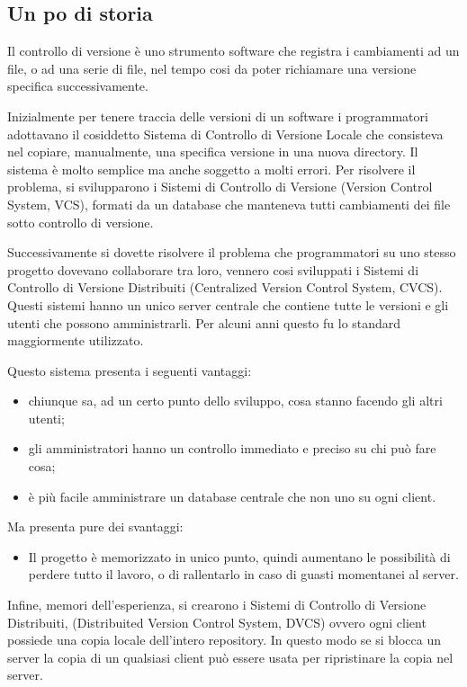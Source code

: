 \subsection{Un po di storia}
Il controllo di versione è uno strumento software che registra i cambiamenti ad un file, o ad una serie di file, nel tempo cosi da poter richiamare una versione specifica successivamente.

Inizialmente per tenere traccia delle versioni di un software i programmatori adottavano il cosiddetto Sistema di Controllo di Versione Locale che consisteva nel copiare, manualmente, una specifica versione in una nuova directory. Il sistema è molto semplice ma anche soggetto a molti errori. Per risolvere il problema, si svilupparono i Sistemi di Controllo di Versione (Version Control System, VCS), formati da un database che manteneva tutti cambiamenti dei file sotto controllo di versione.

Successivamente si dovette risolvere il problema che programmatori su uno stesso progetto dovevano collaborare tra loro, vennero cosi sviluppati i Sistemi di Controllo di Versione Distribuiti (Centralized Version Control System, CVCS). Questi sistemi hanno un unico server centrale che contiene tutte le versioni e gli utenti che possono amministrarli. Per alcuni anni questo fu lo standard maggiormente utilizzato.

Questo sistema presenta i seguenti vantaggi:

\begin{itemize}
\item chiunque sa, ad un certo punto dello sviluppo, cosa stanno facendo gli altri utenti;
\item gli amministratori hanno un controllo immediato e preciso su chi può fare cosa;
\item è più facile amministrare un database centrale che non uno su ogni client.
\end{itemize}

Ma presenta pure dei svantaggi:

\begin{itemize}
\item Il progetto è memorizzato in unico punto, quindi aumentano le possibilità di perdere tutto il lavoro, o di rallentarlo in caso di guasti momentanei al server.
\end{itemize}

Infine, memori dell'esperienza, si crearono i Sistemi di Controllo di Versione Distribuiti, (Distribuited Version Control System, DVCS) ovvero ogni client possiede una copia locale dell'intero repository. In questo modo se si blocca un server la copia di un qualsiasi client può essere usata per ripristinare la copia nel server.

